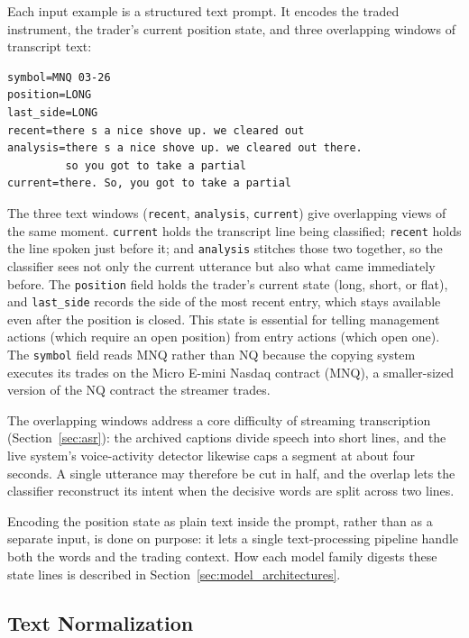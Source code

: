 Each input example is a structured text prompt. It encodes the traded instrument, the trader's current position state, and three overlapping windows of transcript text:

\begin{verbatim}
symbol=MNQ 03-26
position=LONG
last_side=LONG
recent=there s a nice shove up. we cleared out
analysis=there s a nice shove up. we cleared out there.
         so you got to take a partial
current=there. So, you got to take a partial
\end{verbatim}

The three text windows (\texttt{recent}, \texttt{analysis}, \texttt{current}) give overlapping views of the same moment. \texttt{current} holds the transcript line being classified; \texttt{recent} holds the line spoken just before it; and \texttt{analysis} stitches those two together, so the classifier sees not only the current utterance but also what came immediately before. The \texttt{position} field holds the trader's current state (long, short, or flat), and \texttt{last\_side} records the side of the most recent entry, which stays available even after the position is closed. This state is essential for telling management actions (which require an open position) from entry actions (which open one). The \texttt{symbol} field reads MNQ rather than NQ because the copying system executes its trades on the Micro E-mini Nasdaq contract (MNQ), a smaller-sized version of the NQ contract the streamer trades.

The overlapping windows address a core difficulty of streaming transcription (Section~\ref{sec:asr}): the archived captions divide speech into short lines, and the live system's voice-activity detector likewise caps a segment at about four seconds. A single utterance may therefore be cut in half, and the overlap lets the classifier reconstruct its intent when the decisive words are split across two lines.

Encoding the position state as plain text inside the prompt, rather than as a separate input, is done on purpose: it lets a single text-processing pipeline handle both the words and the trading context. How each model family digests these state lines is described in Section~\ref{sec:model_architectures}.

\subsection{Text Normalization}
\label{sec:normalization}


